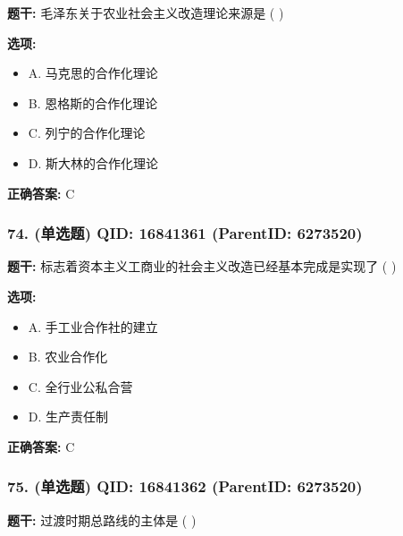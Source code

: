 \documentclass[12pt,UTF8]{ctexart}
\begin{document}
\textbf{题干:}
毛泽东关于农业社会主义改造理论来源是 ( )



\textbf{选项:}
\begin{itemize}[leftmargin=*]

  \item A. 马克思的合作化理论

  \item B. 恩格斯的合作化理论

  \item C. 列宁的合作化理论

  \item D. 斯大林的合作化理论

\end{itemize}

\textbf{正确答案:}
C

\vspace{0.3em}\hrulefill\vspace{0.7em}

\subsubsection*{74. (单选题) \small QID: 16841361 (ParentID: 6273520)}

\textbf{题干:}
标志着资本主义工商业的社会主义改造已经基本完成是实现了 ( )



\textbf{选项:}
\begin{itemize}[leftmargin=*]

  \item A. 手工业合作社的建立

  \item B. 农业合作化

  \item C. 全行业公私合营

  \item D. 生产责任制

\end{itemize}

\textbf{正确答案:}
C

\vspace{0.3em}\hrulefill\vspace{0.7em}

\subsubsection*{75. (单选题) \small QID: 16841362 (ParentID: 6273520)}

\textbf{题干:}
过渡时期总路线的主体是 ( )
\end{document}
